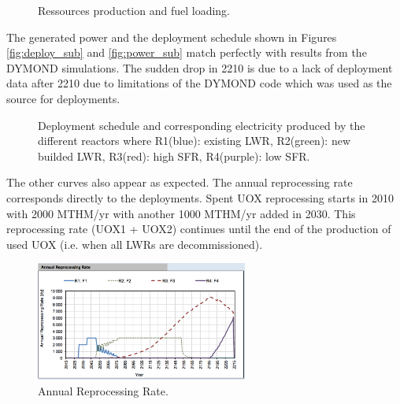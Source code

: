 \documentclass[12pt]{article}
\begin{document}
\begin{figure}[h!]
    \centering
    \caption{Ressources production and fuel loading.\label{fig:RessourceUsed} }
\end{figure}

The generated power and the deployment schedule shown in Figures
\ref{fig:deploy_sub} and \ref{fig:power_sub} match perfectly with results from
the DYMOND simulations. The sudden drop in 2210 is due to a lack of deployment
data after 2210 due to limitations of the DYMOND code which was used as the
source for deployments.

\begin{figure}[h!]
    \centering
    \caption{Deployment schedule and corresponding
    electricity produced by the different reactors
    where R1(blue): existing LWR, R2(green): new
    builded LWR, R3(red): high SFR, R4(purple): low
    SFR.\label{fig:deployment_bis} }
\end{figure}

The other curves also appear as expected. The annual reprocessing rate
corresponds directly to the deployments. Spent UOX reprocessing starts in 2010
with 2000 MTHM/yr with another 1000 MTHM/yr added in 2030.  This reprocessing
rate (UOX1 + UOX2) continues until the end of the production of used UOX (i.e.
when all LWRs are decommissioned).

\begin{figure}[h!]
    \centering
    \includegraphics[width=0.62\textwidth]	{img/AnnualReprocessingRate_1}
    \caption{Annual Reprocessing Rate.}
    \label{fig:reprocessing_1}
\end{figure}
\end{document}
